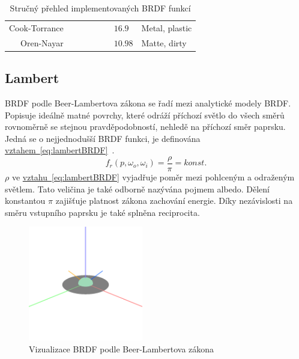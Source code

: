 \documentclass[czech,master]{diploma}
\newcommand{\point}{p}
\newcommand{\brdf}{f_r\left(\point,\omega_{o},\omega_{i}\right)}
\newcommand{\alb}{\rho}
\newcommand{\true}{\ding{51}}
\newcommand{\false}{\ding{55}}
\begin{document}
\begin{table}[ht]
\begin{tabular}{r|lllllll}
    Cook-Torrance        & \true                    & \true                     & \true                       & \false                      & \false                   & \(16.9\)                            & Metal, plastic                \\
    Oren-Nayar           & \true                    & \true                     & \false                      & \false                      & \true                    & \(10.98\)                           & Matte, dirty                  \\
    \hline
  \end{tabular}
  \caption{Stručný přehled implementovaných BRDF funkcí}
  \label{tab:brdfProperties}
\end{table}

\subsection{Lambert} \label{sec:Lambert}
BRDF podle Beer-Lambertova zákona se řadí mezi analytické modely BRDF\@. Popisuje ideálně matné povrchy, které odráží příchozí světlo do všech směrů rovnoměrně se stejnou pravděpodobností, nehledě na příchozí směr paprsku. Jedná se o nejjednodušší BRDF funkci, je definována \hyperref[eq:lambertBRDF]{vztahem~\ref{eq:lambertBRDF}}~\cite{Koppal2014}.
\begin{equation} \label{eq:lambertBRDF}
  \brdf = \frac{\alb}{\pi} = konst.
\end{equation}
\(\alb\) ve \hyperref[eq:lambertBRDF]{vztahu~\ref{eq:lambertBRDF}} vyjadřuje poměr mezi pohlceným a odraženým světlem. Tato veličina je také odborně nazývána pojmem albedo. Dělení konstantou \(\pi\) zajišťuje platnost zákona zachování energie. Díky nezávislosti na směru vstupního paprsku je také splněna reciprocita.

\begin{figure}[ht]%
  \centering\includegraphics[width=5cm]{Figures/visualizations/brdfLambert.png}%
  \caption{Vizualizace BRDF podle Beer-Lambertova zákona}%
  \label{fig:lambertBRDFRender}%
\end{figure}
\end{document}
